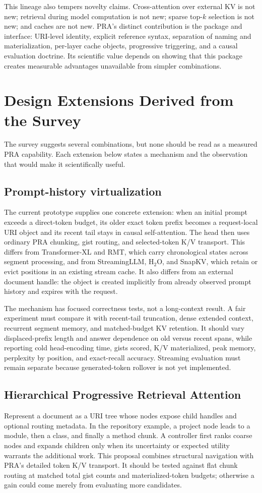 \documentclass[10pt,a4paper]{article}
\begin{document}
This lineage also tempers novelty claims. Cross-attention over external KV is not new; retrieval during model computation is not new; sparse top-$k$ selection is not new; and caches are not new. PRA's distinct contribution is the package and interface: URI-level identity, explicit reference syntax, separation of naming and materialization, per-layer cache objects, progressive triggering, and a causal evaluation doctrine. Its scientific value depends on showing that this package creates measurable advantages unavailable from simpler combinations.

\section{Design Extensions Derived from the Survey}
The survey suggests several combinations, but none should be read as a measured PRA
capability.  Each extension below states a mechanism and the observation that would make
it scientifically useful.
\subsection{Prompt-history virtualization}
The current prototype supplies one concrete extension: when an initial prompt exceeds a
direct-token budget, its older exact token prefix becomes a request-local URI object and
its recent tail stays in causal self-attention.  The head then uses ordinary PRA chunking,
gist routing, and selected-token K/V transport.  This differs from Transformer-XL and RMT,
which carry chronological states across segment processing, and from StreamingLLM,
H$_2$O, and SnapKV, which retain or evict positions in an existing stream cache.  It also
differs from an external document handle: the object is created implicitly from already
observed prompt history and expires with the request.

The mechanism has focused correctness tests, not a long-context result.  A fair experiment
must compare it with recent-tail truncation, dense extended context, recurrent segment
memory, and matched-budget KV retention.  It should vary displaced-prefix length and
answer dependence on old versus recent spans, while reporting cold head-encoding time,
gists scored, K/V materialized, peak memory, perplexity by position, and exact-recall
accuracy.  Streaming evaluation must remain separate because generated-token rollover is
not yet implemented.

\subsection{Hierarchical Progressive Retrieval Attention}
Represent a document as a URI tree whose nodes expose child handles and optional routing
metadata.  In the repository example, a project node leads to a module, then a class, and
finally a method chunk.  A controller first ranks coarse nodes and expands children only
when its uncertainty or expected utility warrants the additional work.  This proposal
combines structural navigation with PRA's detailed token K/V transport.  It should be
tested against flat chunk routing at matched total gist counts and materialized-token
budgets; otherwise a gain could come merely from evaluating more candidates.
\end{document}
